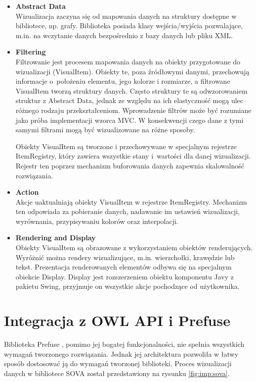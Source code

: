 \begin{itemize}
 \item {\bf Abstract Data } \\
  Wizualizacja zaczyna się od mapowania danych na struktury dostępne w bibliotece, np. grafy. Biblioteka posiada klasy wejścia/wyjścia pozwalające, m.in. na wczytanie 
danych bezpośrednio z bazy danych lub pliku XML. 
\item {\bf Filtering} \\
  Filtrowanie jest procesem mapowania danych na obiekty przygotowane do wizualizacji (VisualItem). Obiekty te, poza źródłowymi danymi, przechowują informacje 
o~położeniu elementu, jego kolorze i rozmiarze, a filtrowane VisualItem tworzą struktury danych. Często struktury te są odwzorowaniem struktur z Abstract Data, 
jednak ze względu na ich elastyczność mogą ulec różnego rodzaju przekształceniom. Wprowadzenie filtrów może być rozumiane jako próba implementacji wzorca MVC. 
W konsekwencji czego dane z tymi samymi filtrami mogą być wizualizowane na różne sposoby.   
\par Obiekty VisualItem są tworzone i przechowywane w specjalnym rejestrze ItemRegistry, który zawiera wszystkie stany i~wartości dla danej wizualizacji. Rejestr
 ten poprzez mechanizm buforowania danych zapewnia skalowalność rozwiązania. 
\item {\bf Action}\\
Akcje uaktualniają obiekty VisualItem w rejestrze ItemRegistry. Mechanizm ten odpowiada za pobieranie danych, nadawanie im ustawień wizualizacji, wyrównania, 
przypisywaniu  kolorów oraz interpolacji.  
\item{\bf Rendering and Display}\\
 Obiekty VisualItem są obrazowane z wykorzystaniem obiektów renderujących. Wyróżnić można rendery  wizualizujące, m.in. wierzchołki, krawędzie lub tekst. Prezentacja 
renderowanych elementów odbywa się na specjalnym obiekcie Display. Display jest rozszerzeniem obiektu komponentu Javy z pakietu Swing, przyjmuje on wszystkie 
akcje pochodzące od użytkownika. 

\end{itemize}


\section{Integracja z OWL API i Prefuse}
Biblioteka Prefuse \cite{prefuse}\cite{prefuse_sdj}, pomimo jej bogatej funkcjonalności, nie spełnia wszystkich wymagań tworzonego rozwiązania. Jednak jej architektura pozwoliła w łatwy 
sposób dostosować ją do wymagań tworzonej biblioteki. Proces wizualizacji danych w bibliotece SOVA został przedstawiony na rysunku \ref{fig:imp:sova}. 

